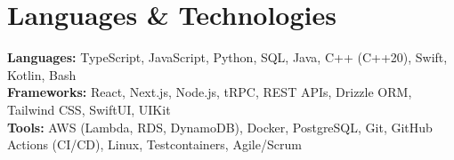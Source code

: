 \documentclass[letterpaper,11pt]{article}
\begin{document}
\section{Languages \& Technologies}
\begin{itemize}[leftmargin=0.15in, label={}]
  \small{\item{
    \textbf{Languages:} TypeScript, JavaScript, Python, SQL, Java, C++ (C++20), Swift, Kotlin, Bash \\
    \textbf{Frameworks:} React, Next.js, Node.js, tRPC, REST APIs, Drizzle ORM, Tailwind CSS, SwiftUI, UIKit \\
    \textbf{Tools:} AWS (Lambda, RDS, DynamoDB), Docker, PostgreSQL, Git, GitHub Actions (CI/CD), Linux, Testcontainers, Agile/Scrum
  }}
\end{itemize}
\end{document}
